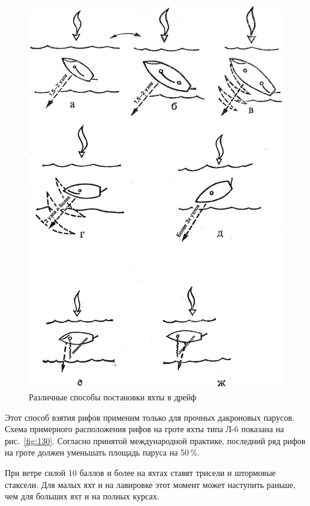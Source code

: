 \documentclass[a4paper, 12pt, twoside, final, book, russian, fittopage, cyremdash]{ncc}
\newcommand{\ris}[1]{\ref{fig:#1}}
\begin{document}
\begin{figure}[htb]
  \centering{}
  \includegraphics[scale=1.3]{0131P}
  \caption{Различные способы постановки яхты в дрейф}
  \label{fig:131}
\end{figure}

Этот способ взятия рифов применим только для прочных дакроновых парусов. Схема примерного расположения рифов на гроте яхты типа Л-6 показана на рис.~\ris{130}. Согласно принятой международной практике, последний ряд рифов на гроте должен уменьшать площадь паруса на 50\,\%. 

При ветре силой 10 баллов и более на яхтах ставят трисели и штормовые стаксели. Для малых яхт и на лавировке этот момент может наступить раньше, чем для больших яхт и на полных курсах. 
\end{document}
